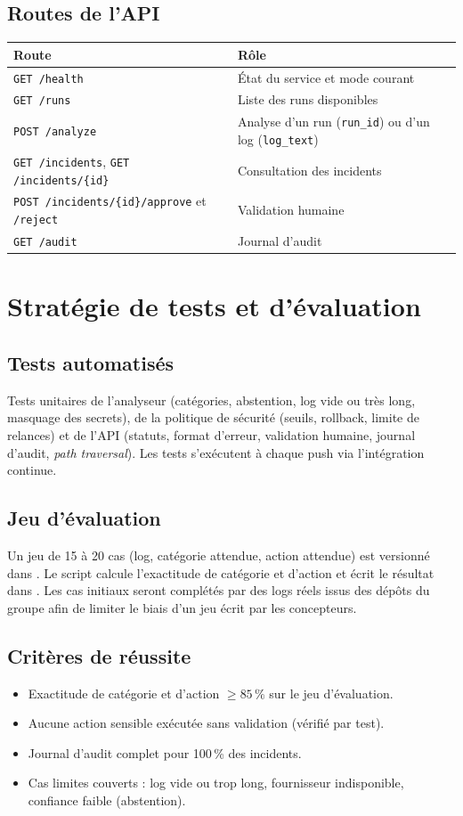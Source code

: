 \documentclass[11pt,a4paper]{article}
\newcommand{\code}[1]{\texttt{#1}}
\begin{document}
\subsection{Routes de l'API}
\begin{longtable}{p{4.7cm}p{9.8cm}}
\toprule
\textbf{Route} & \textbf{Rôle} \\
\midrule\endhead
\code{GET /health} & État du service et mode courant \\
\code{GET /runs} & Liste des runs disponibles \\
\code{POST /analyze} & Analyse d'un run (\code{run\_id}) ou d'un log (\code{log\_text}) \\
\code{GET /incidents}, \code{GET /incidents/\{id\}} & Consultation des incidents \\
\code{POST /incidents/\{id\}/approve} et \code{/reject} & Validation humaine \\
\code{GET /audit} & Journal d'audit \\
\bottomrule
\end{longtable}

\section{Stratégie de tests et d'évaluation}
\subsection{Tests automatisés}
Tests unitaires de l'analyseur (catégories, abstention, log vide ou très long, masquage des secrets),
de la politique de sécurité (seuils, rollback, limite de relances) et de l'API (statuts, format
d'erreur, validation humaine, journal d'audit, \emph{path traversal}). Les tests s'exécutent à chaque push via l'intégration continue.

\subsection{Jeu d'évaluation}
Un jeu de 15 à 20 cas (log, catégorie attendue, action attendue) est versionné dans .
Le script  calcule l'exactitude de catégorie et d'action et écrit le résultat dans .
Les cas initiaux seront complétés par des logs réels issus des dépôts du groupe afin de limiter le biais d'un jeu écrit par les concepteurs.

\subsection{Critères de réussite}
\begin{itemize}
\item Exactitude de catégorie et d'action $\geq 85\,\%$ sur le jeu d'évaluation.
\item Aucune action sensible exécutée sans validation (vérifié par test).
\item Journal d'audit complet pour 100\,\% des incidents.
\item Cas limites couverts : log vide ou trop long, fournisseur indisponible, confiance faible (abstention).
\end{itemize}
\end{document}
